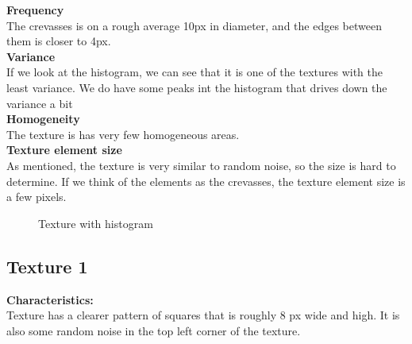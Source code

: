 \documentclass{article}
\begin{document}
\textbf{Frequency} \\
The crevasses is on a rough average 10px in diameter, and the edges between them is closer to 4px.\\ 


\textbf{Variance}\\
If we look at the histogram, we can see that it is one of the textures with the least variance. We do have some peaks int the histogram that drives down the variance a bit\\

\textbf{Homogeneity}\\
The texture is has very few homogeneous areas.\\

\textbf{Texture element size}\\
As mentioned, the texture is very similar to random noise, so the size is hard to determine. If we think of the elements as the crevasses, the texture element size is a few pixels.  

\begin{figure}[h]%
	\centering
    \qquad
    \caption{Texture with histogram}%
    \label{fig:IMG0}%
\end{figure}



\newpage
\subsection{Texture 1}
\textbf{Characteristics:}\\
Texture has a clearer pattern of squares that is roughly 8 px wide and high.
It is also some random noise in the top left corner of the texture. 
\\
\end{document}
